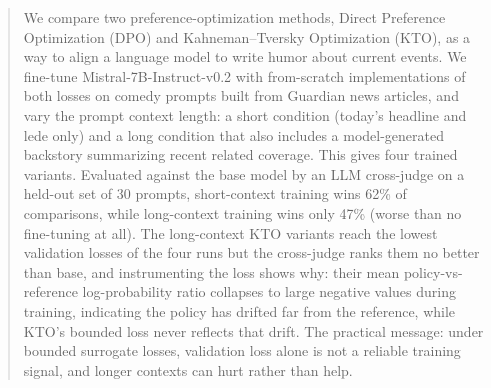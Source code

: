\begin{abstract}
We compare two preference-optimization methods, Direct Preference Optimization (DPO) and Kahneman--Tversky Optimization (KTO), as a way to align a language model to write humor about current events.  We fine-tune Mistral-7B-Instruct-v0.2 with from-scratch implementations of both losses on comedy prompts built from Guardian news articles, and vary the prompt context length: a short condition (today's headline and lede only) and a long condition that also includes a model-generated backstory summarizing recent related coverage.  This gives four trained variants.  Evaluated against the base model by an LLM cross-judge on a held-out set of 30 prompts, short-context training wins 62\% of comparisons, while long-context training wins only 47\% (worse than no fine-tuning at all).  The long-context KTO variants reach the lowest validation losses of the four runs but the cross-judge ranks them no better than base, and instrumenting the loss shows why: their mean policy-vs-reference log-probability ratio collapses to large negative values during training, indicating the policy has drifted far from the reference, while KTO's bounded loss never reflects that drift.  The practical message: under bounded surrogate losses, validation loss alone is not a reliable training signal, and longer contexts can hurt rather than help.
\end{abstract}
